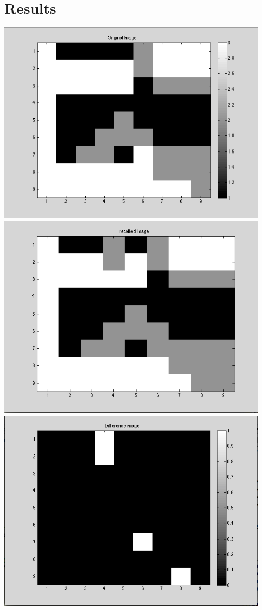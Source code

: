 \documentclass[epsfig]{article}
\begin{document}
\section*{Results}
\begin{center}
\includegraphics[scale=0.42]{pic1}
\includegraphics[scale=0.42]{pic2}
\includegraphics[scale=0.42]{pic3}
\end{center}
\end{document}
